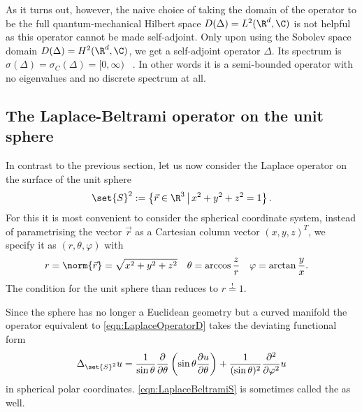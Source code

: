 As it turns out, however,
the naive choice of taking the domain of the operator to be the full
quantum-mechanical Hilbert space $D(\Delta) = L^2(\R^d, \C)$
is not helpful as this operator cannot be made self-adjoint.
Only upon using the Sobolev space domain $D(\Delta) = H^2(\R^d, \C)$,
we get a self-adjoint operator $\Delta$.
Its spectrum is $\sigma(\Delta) = \sigma_C(\Delta) = [0, \infty)$%
~\cite[example 3.2.2]{Davies2007}.
In other words it is a semi-bounded operator with no eigenvalues and no
discrete spectrum at all.

\subsection{The Laplace-Beltrami operator on the unit sphere}
\label{sec:SpectrumLaplaceBeltrami}

In contrast to the previous section,
let us now consider the Laplace operator on the surface of the unit sphere
\[
	\set{S}^2 := \left\{ \vec{r} \in \R^3 \, \middle| \, x^2 + y^2 + z^2 = 1 \right\}.
\]
For this it is most convenient to consider
the spherical coordinate system,
\ie instead of parametrising the vector $\vec{r}$ as a
Cartesian column vector $(x, y, z)^T$,
we specify it as $(r, \theta, \varphi)$ with
\begin{align*}
	r &= \norm{\vec{r}} = \sqrt{x^2+y^2+z^2} & \theta &= \arccos\frac{z}{r} & \varphi &= \arctan\frac{y}{x}.
\end{align*}
The condition for the unit sphere than reduces to $r\stackrel{!}{=}1$.

Since the sphere has no longer a Euclidean geometry
but a curved manifold
the operator equivalent to \eqref{eqn:LaplaceOperatorD} takes
the deviating functional form
\newcommand{\laplaceSphere}{\Delta_{\set{S}^2}}
\begin{equation}
	\laplaceSphere  u = \frac{1}{\sin \theta} \frac{\partial}{\partial \theta}
\left( \sin \theta \frac{\partial u}{\partial \theta}  \right)
+ \frac{1}{(\sin \theta)^2} \frac{\partial^2}{\partial \varphi^2} u
	\label{eqn:LaplaceBeltramiS}
\end{equation}
in spherical polar coordinates.
\eqref{eqn:LaplaceBeltramiS} is sometimes called the
 as well.

